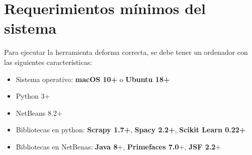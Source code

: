 
\section{Requerimientos mínimos del sistema}

Para ejecutar la herramienta deforma correcta, se debe tener un ordenador con las siguientes características:

\begin{itemize}
	\item Sistema operativo: \textbf{macOS 10+} o \textbf{Ubuntu 18+}
	\item Python 3$+$
	\item NetBeans 8.2$+$
	\item Bibliotecas en python: \textbf{Scrapy 1.7+}, \textbf{Spacy 2.2+}, \textbf{Scikit Learn 0.22+}
	\item Bibliotecas en NetBenas: \textbf{Java 8$+$}, \textbf{Primefaces 7.0$+$}, \textbf{JSF 2.2$+$} 
\end{itemize}	




